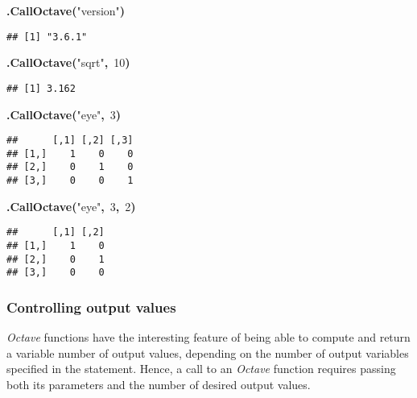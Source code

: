 \documentclass[english,10pt,a4paper]{article}\usepackage{graphicx, color}
\makeatletter
\newcommand{\hlnumber}[1]{\textcolor[rgb]{0,0,0}{#1}}%
\newcommand{\hlfunctioncall}[1]{\textcolor[rgb]{0.501960784313725,0,0.329411764705882}{\textbf{#1}}}%
\newcommand{\hlstring}[1]{\textcolor[rgb]{0.6,0.6,1}{#1}}%
\newcommand{\hlkeyword}[1]{\textcolor[rgb]{0,0,0}{\textbf{#1}}}%
\newenvironment{kframe}{%
 \def\FrameCommand##1{\hskip\@totalleftmargin \hskip-\fboxsep
 \colorbox{shadecolor}{##1}\hskip-\fboxsep
     \hskip-\linewidth \hskip-\@totalleftmargin \hskip\columnwidth}%
 \MakeFramed {\advance\hsize-\width
   \@totalleftmargin\z@ \linewidth\hsize
   \@setminipage}}%
 {\par\unskip\endMakeFramed}
\newenvironment{knitrout}{}{} %
\let\proglang=\textit
\newcommand{\octave}{\proglang{Octave}\xspace}
\makeatother
\begin{document}
\begin{knitrout}
\color{fgcolor}\begin{kframe}
\begin{flushleft}
\ttfamily\noindent
\hlfunctioncall{.CallOctave}\hlkeyword{(}\hlstring{"{}version"{}}\hlkeyword{)}\mbox{}
\normalfont
\end{flushleft}
\begin{verbatim}
## [1] "3.6.1"
\end{verbatim}
\begin{flushleft}
\ttfamily\noindent
\hlfunctioncall{.CallOctave}\hlkeyword{(}\hlstring{"{}sqrt"{}}\hlkeyword{,}{\ }\hlnumber{10}\hlkeyword{)}\mbox{}
\normalfont
\end{flushleft}
\begin{verbatim}
## [1] 3.162
\end{verbatim}
\begin{flushleft}
\ttfamily\noindent
\hlfunctioncall{.CallOctave}\hlkeyword{(}\hlstring{"{}eye"{}}\hlkeyword{,}{\ }\hlnumber{3}\hlkeyword{)}\mbox{}
\normalfont
\end{flushleft}
\begin{verbatim}
##      [,1] [,2] [,3]
## [1,]    1    0    0
## [2,]    0    1    0
## [3,]    0    0    1
\end{verbatim}
\begin{flushleft}
\ttfamily\noindent
\hlfunctioncall{.CallOctave}\hlkeyword{(}\hlstring{"{}eye"{}}\hlkeyword{,}{\ }\hlnumber{3}\hlkeyword{,}{\ }\hlnumber{2}\hlkeyword{)}\mbox{}
\normalfont
\end{flushleft}
\begin{verbatim}
##      [,1] [,2]
## [1,]    1    0
## [2,]    0    1
## [3,]    0    0
\end{verbatim}
\end{kframe}
\end{knitrout}


\subsubsection{Controlling output values}
\label{sec:argout}

\octave functions have the interesting feature of being able to compute
and return a variable number of output values, depending on the number of output
variables specified in the statement.
Hence, a call to an \octave function requires passing both its parameters and
the number of desired output values.
\end{document}
